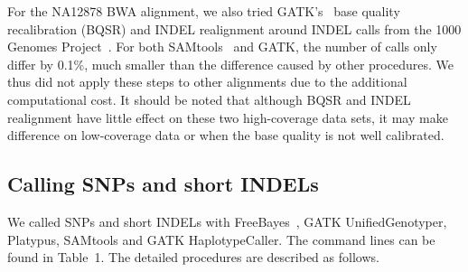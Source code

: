 \documentclass{bioinfo}
\begin{document}
\begin{methods}
For the NA12878 BWA alignment, we also tried GATK's~\citep{Depristo:2011vn}
base quality recalibration (BQSR) and INDEL realignment around INDEL calls from
the 1000 Genomes Project~\citep{1000g:2012aa}. For both
SAMtools~\citep{Li:2011ab} and GATK, the number of calls only differ by 0.1\%,
much smaller than the difference caused by other procedures. We thus did not
apply these steps to other alignments due to the additional computational cost.
It should be noted that although BQSR and INDEL realignment have little effect
on these two high-coverage data sets, it may make difference on low-coverage
data or when the base quality is not well calibrated.

\subsection{Calling SNPs and short INDELs}

We called SNPs and short INDELs with FreeBayes~\citep{Garrison:2012aa}, GATK
UnifiedGenotyper, Platypus, SAMtools and GATK HaplotypeCaller. The command
lines can be found in Table~1. The detailed procedures are described as
follows.


\end{methods}
\end{document}
